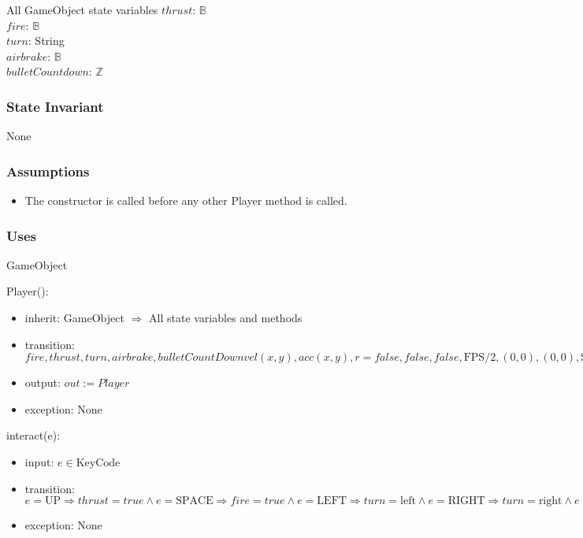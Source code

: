 \documentclass[12pt]{article}
\begin{document}
All GameObject state variables
$thrust$: $\mathbb{B}$\\
$fire$: $\mathbb{B}$\\
$turn$: String\\
$airbrake$: $\mathbb{B}$\\
$bulletCountdown$: $\mathbb{Z}$

\subsubsection* {State Invariant}

None

\subsubsection* {Assumptions}

\begin{itemize}
  \item The constructor is called before any other Player method is called.
\end{itemize}

\subsubsection*{Uses}
GameObject

Player():
\begin{itemize}
    \item inherit: GameObject $\Rightarrow$ All state variables and methods
    \item transition: $ fire, thrust, turn, airbrake, bulletCountDown vel(x,y), acc(x,y), r = false, false, false, \mbox{FPS}/2, (0,0), (0,0), \mbox{SHIP\_SIZE/2}$
    \item output: $out := Player$
    \item exception: None
\end{itemize}

\noindent interact(e):
\begin{itemize}
  \item input: $e \in \mbox{KeyCode}$
  \item transition: $e = \mbox{UP} \Rightarrow thrust = true \land e = \mbox{SPACE} \Rightarrow fire = true \land e = \mbox{LEFT} \Rightarrow turn = \mbox{left} \land e = \mbox{RIGHT} \Rightarrow turn = \mbox{right} \land e = \mbox{DOWN} \Rightarrow airbrake = true$
  \item exception: None
\end{itemize}
\end{document}
